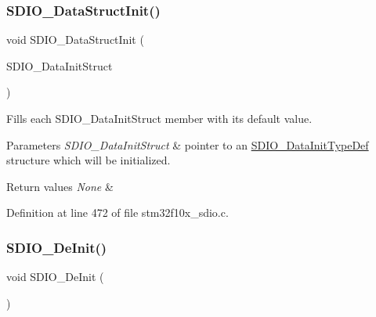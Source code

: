 \subsubsection{\texorpdfstring{S\+D\+I\+O\+\_\+\+Data\+Struct\+Init()}{SDIO\_DataStructInit()}}
{\footnotesize\ttfamily void S\+D\+I\+O\+\_\+\+Data\+Struct\+Init (\begin{DoxyParamCaption}\item[{\hyperlink{struct_s_d_i_o___data_init_type_def}{S\+D\+I\+O\+\_\+\+Data\+Init\+Type\+Def} $\ast$}]{S\+D\+I\+O\+\_\+\+Data\+Init\+Struct }\end{DoxyParamCaption})}



Fills each S\+D\+I\+O\+\_\+\+Data\+Init\+Struct member with its default value. 


\begin{DoxyParams}{Parameters}
{\em S\+D\+I\+O\+\_\+\+Data\+Init\+Struct} & pointer to an \hyperlink{struct_s_d_i_o___data_init_type_def}{S\+D\+I\+O\+\_\+\+Data\+Init\+Type\+Def} structure which will be initialized. \\
\hline
\end{DoxyParams}

\begin{DoxyRetVals}{Return values}
{\em None} & \\
\hline
\end{DoxyRetVals}


Definition at line 472 of file stm32f10x\+\_\+sdio.\+c.

\mbox{\label{group___s_d_i_o___exported___functions_gac359d2c6c67a2590f8f9b720c0e4ff1b}} 
\subsubsection{\texorpdfstring{S\+D\+I\+O\+\_\+\+De\+Init()}{SDIO\_DeInit()}}
{\footnotesize\ttfamily void S\+D\+I\+O\+\_\+\+De\+Init (\begin{DoxyParamCaption}\item[{void}]{ }\end{DoxyParamCaption})}



